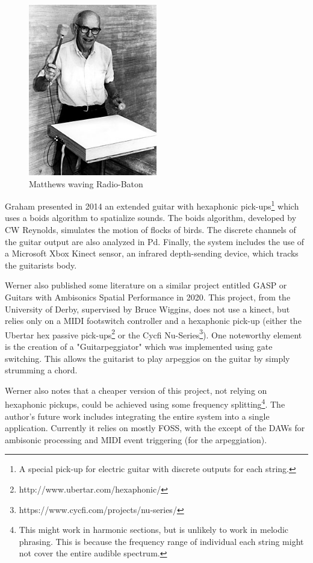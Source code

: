\begin{figure}[ht!]%
\centering
\includegraphics[width=0.5\textwidth]{img/mathews260.jpg} 
\caption{Matthews waving Radio-Baton \cite{FileMath82online}}
\label{fig:baton}
\end{figure}

Graham \cite{graham2014gesture} presented in 2014 an extended guitar with hexaphonic pick-ups\footnote{A special pick-up for electric guitar with discrete outputs for each string.} which uses a boids algorithm to spatialize sounds. The boids algorithm, developed by CW Reynolds, simulates the motion of flocks of birds. The discrete channels of the guitar output are also analyzed in Pd. Finally, the system includes the use of a Microsoft Xbox Kinect sensor, an infrared depth-sending device, which tracks the guitarists body.

Werner \cite{wernerdevelopment} also published some literature on a similar project entitled GASP or Guitars with Ambisonics Spatial Performance in 2020. This project, from the University of Derby, supervised by Bruce Wiggins, does not use a kinect, but relies only on a MIDI footswitch controller and a hexaphonic pick-up (either the Ubertar hex passive pick-ups\footnote{http://www.ubertar.com/hexaphonic/} or the Cycfi Nu-Series\footnote{https://www.cycfi.com/projects/nu-series/}). One noteworthy element is the creation of a "Guitarpeggiator" which was implemented using gate switching. This allows the guitarist to play arpeggios on the guitar by simply strumming a chord. 

Werner also notes that a cheaper version of this project, not relying on hexaphonic pickups, could be achieved using some frequency splitting\footnote{This might work in harmonic sections, but is unlikely to work in melodic phrasing. This is because the frequency range of individual each string might not cover the entire audible spectrum.}. The author's future work includes integrating the entire system into a single application. Currently it relies on mostly FOSS, with the except of the DAWs for ambisonic processing and MIDI event triggering (for the arpeggiation). 

